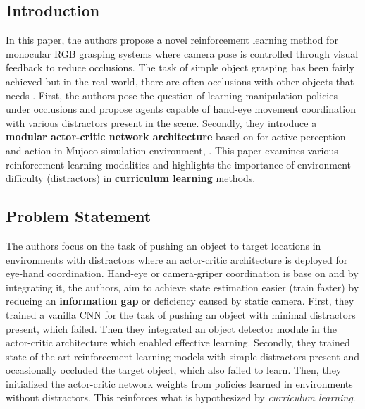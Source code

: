 \documentclass[11pt]{article}
\begin{document}
      \subsection{Introduction}
      \par In this paper, the authors propose a novel reinforcement learning method
      for monocular RGB grasping systems where camera pose is controlled through
      visual feedback to reduce occlusions. The task of simple object grasping has been fairly achieved
      but in the real world, there are often occlusions with other objects that needs .
      First, the authors pose the question of learning manipulation policies under
      occlusions and propose agents capable of hand-eye movement coordination with
      various distractors present in the scene. Secondly, they introduce a \textbf{modular
      actor-critic network architecture} based on \cite{andrychowicz2017hindsight}
      for active perception and action in Mujoco simulation environment, \cite{todorov2012mujoco}.
      This paper examines various reinforcement learning modalities and highlights the
      importance of environment difficulty (distractors) in \textbf{curriculum learning}
      methods.

      \subsection{Problem Statement}
      \par The authors focus on the task of pushing an object to target locations in
      environments with distractors where an actor-critic architecture is deployed for
      eye-hand coordination. Hand-eye or camera-griper coordination is base on
      \cite{soatto2013actionable} and by integrating it, the authors, aim to achieve
      state estimation easier (train faster) by reducing an \textbf{information gap}
      or deficiency caused by static camera. First, they trained a vanilla CNN for the
      task of pushing an object with minimal distractors present, which failed. Then
      they integrated an object detector module in the actor-critic architecture which
      enabled effective learning. Secondly, they trained state-of-the-art reinforcement
      learning models with simple distractors present and occasionally occluded the
      target object, which also failed to learn. Then, they initialized the actor-critic
      network weights from policies learned in environments without distractors. This
      reinforces what is hypothesized by \textit{curriculum learning}.
\end{document}
